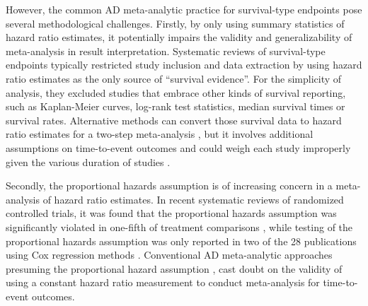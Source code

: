 \documentclass[12pt]{article}
\theoremstyle{mystyle}
\begin{document}
\iffalse


However, the common AD meta-analytic practice for survival-type endpoints pose several methodological challenges. Firstly, by only using summary statistics of hazard ratio estimates, it potentially impairs the validity and generalizability of meta-analysis in result interpretation. 
Systematic reviews of survival-type endpoints typically restricted study inclusion and data extraction by using hazard ratio estimates as the only source of ``survival evidence''.
For the simplicity of analysis, they excluded studies that embrace other kinds of survival reporting, such as Kaplan-Meier curves, log-rank test statistics, median survival times or survival rates.
Alternative methods can convert those survival data to hazard ratio estimates for a two-step meta-analysis \citep{Tudur2001, Tierney2007}, but it involves additional assumptions on time-to-event outcomes and could weigh each study improperly given the various duration of studies \citep{Riley2007}.  

Secondly, the proportional hazards assumption is of increasing concern in a meta-analysis of hazard ratio estimates. 
In recent systematic reviews of randomized controlled trials, it was found that the proportional hazards assumption was significantly violated in one-fifth of treatment comparisons \citep{Rulli2018}, while testing of the proportional hazards assumption was only reported in two of the 28 publications using Cox regression methods \citep{batson2016review}. Conventional AD meta-analytic approaches presuming the proportional hazard assumption \citep{Kristiansen2012}, cast doubt on the validity of using a constant hazard ratio measurement to conduct meta-analysis for time-to-event outcomes. %
\end{document}
